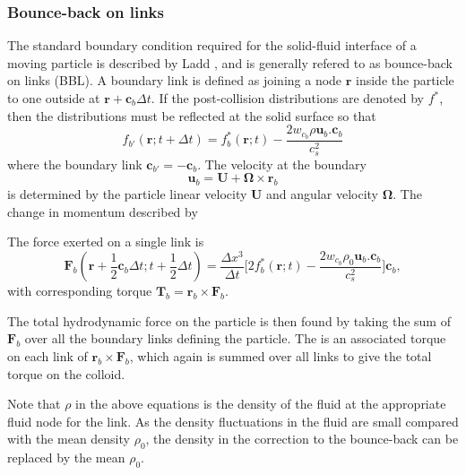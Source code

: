 \subsubsection{Bounce-back on links}

The standard boundary condition required for the solid-fluid
interface of a moving particle is described by Ladd \cite{l94b},
and is generally refered to as bounce-back on links (BBL).
A boundary link is defined as joining a node $\mathbf{r}$
inside the particle to one outside at $\mathbf{r} + \mathbf{c}_b \Delta t$.
If the post-collision distributions are denoted by $f^\ast$, then
the distributions must be reflected at the solid surface so that
\begin{equation}
\label{eq:bbl1}
f_{b'}(\mathbf{r}; t + \Delta t) = f_b^\ast (\mathbf{r}; t)
- \frac{2w_{c_b} \rho \mathbf{u}_b.\mathbf{c}_b}{c_s^2}
\end{equation}
where the boundary link $\mathbf{c}_{b'} = -\mathbf{c}_b$. The velocity
at the boundary
\begin{equation}
\label{eq:ub}
\mathbf{u}_b = \mathbf{U} + \mathbf{\Omega}\times\mathbf{r}_b
\end{equation}
is determined by the particle linear velocity $\mathbf{U}$ and angular
velocity $\mathbf{\Omega}$. The change in momentum described by

The force exerted on a
single link is
\begin{equation}
\mathbf{F}_b(\mathbf{r} + {\scriptstyle\frac{1}{2}}\mathbf{c}_b\Delta t;
t + {\scriptstyle\frac{1}{2}}\Delta t) = \frac{\Delta x^3}{\Delta t}
\Big[ 2f_b^\ast(\mathbf{r}; t) - \frac{2w_{c_b}\rho_0 \mathbf{u}_b .
\mathbf{c}_b}{c_s^2} \Big] \mathbf{c}_b,
\end{equation}
with corresponding torque $\mathbf{T}_b = \mathbf{r}_b \times \mathbf{F}_b$.




The total hydrodynamic force on the particle is then found by taking
the sum of
$\mathbf{F}_b$ over all the boundary links defining the particle.
The is an associated torque on each link of $\mathbf{r}_b\times\mathbf{F}_b$,
which again is summed over all links to give the total torque on the colloid.

Note that $\rho$ in the above equations is the density of the fluid
at the appropriate fluid node for the link. As the density fluctuations
in the fluid are small compared with the mean density $\rho_0$, the
density in the correction to the bounce-back can be replaced by the
mean $\rho_0$.


